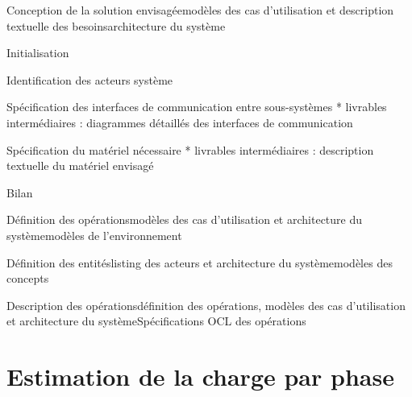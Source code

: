 \begin{Phase}{Conception de la solution envisagée}{modèles des cas d'utilisation et description textuelle des besoins}{architecture du système}
\begin{SubPhases}
\item Initialisation
\item Identification des acteurs système
\item Spécification des interfaces de communication entre sous-systèmes
* livrables intermédiaires : diagrammes détaillés des interfaces de communication
\item Spécification du matériel nécessaire
* livrables intermédiaires : description textuelle du matériel envisagé
\item Bilan
\end{SubPhases}
\end{Phase}

\begin{Phase}{Définition des opérations}{modèles des cas d'utilisation et architecture du système}{modèles de l'environnement}
\end{Phase}

\begin{Phase}{Définition des entités}{listing des acteurs et architecture du système}{modèles des concepts}
\end{Phase}

\begin{Phase}{Description des opérations}{définition des opérations, modèles des cas d'utilisation et architecture du système}{Spécifications OCL des opérations}
\end{Phase}

\section{Estimation de la charge par phase}

